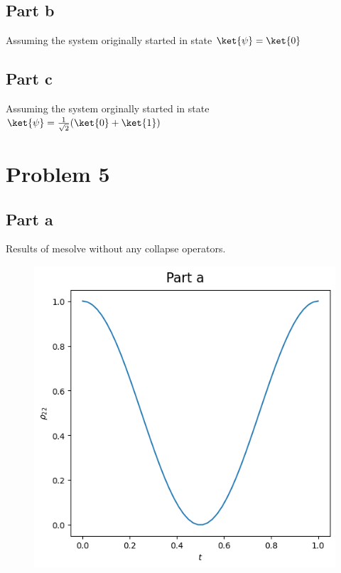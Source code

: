 \subsection*{Part b}
Assuming the system originally started in state $\ket{\psi} = \ket{0}$
\subsection*{Part c}
Assuming the system orginally started in state $\ket{\psi} = \frac{1}{\sqrt{2}}(\ket{0}+\ket{1})$
\pagebreak
\section*{Problem 5}
\subsection*{Part a}
Results of mesolve without any collapse operators.
\begin{figure}[H]
    \centering
    \includegraphics[width=0.75\linewidth]{Resources//245//Homework 9/245 Homework 9 Problem 5a.png}
    \label{fig:enter-label}
\end{figure}

